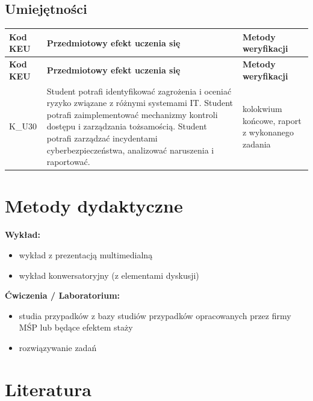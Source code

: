 \documentclass[12pt, a4paper]{article}
\newcommand{\thdrule}{\noalign{\global\setlength{\extrarowheight}{0pt}}}
\newcommand{\thdend}{\noalign{\global\setlength{\extrarowheight}{3pt}}}
\begin{document}
\subsection*{Umiejętności}
{\scriptsize
\begin{longtable}{m{1.6cm}m{9.0cm}m{4.2cm}}
\thdrule\toprule
\rowcolor{pjatkRed} {\color{white}\footnotesize\textbf{\vphantom{Ag}Kod KEU}} & {\color{white}\footnotesize\textbf{\vphantom{Ag}Przedmiotowy efekt uczenia się}} & {\color{white}\footnotesize\textbf{\vphantom{Ag}Metody weryfikacji}} \\
\midrule\thdend
\endfirsthead
\thdrule\toprule
\rowcolor{pjatkRed} {\color{white}\footnotesize\textbf{\vphantom{Ag}Kod KEU}} & {\color{white}\footnotesize\textbf{\vphantom{Ag}Przedmiotowy efekt uczenia się}} & {\color{white}\footnotesize\textbf{\vphantom{Ag}Metody weryfikacji}} \\
\midrule\thdend
\endhead
  \rowcolor{tableRowLight} K\_U30 & Student potrafi identyfikować zagrożenia i oceniać ryzyko związane z różnymi systemami IT. Student potrafi zaimplementować mechanizmy kontroli dostępu i zarządzania tożsamością. Student potrafi zarządzać incydentami cyberbezpieczeństwa, analizować naruszenia i raportować. & kolokwium końcowe, raport z wykonanego zadania \\
\bottomrule
\end{longtable}}

\section{Metody dydaktyczne}

\textbf{Wykład:}
\begin{itemize}
  \item wykład z prezentacją multimedialną
  \item wykład konwersatoryjny (z elementami dyskusji)
\end{itemize}
\vspace{4pt}
\textbf{Ćwiczenia / Laboratorium:}
\begin{itemize}
  \item studia przypadków z bazy studiów przypadków opracowanych przez firmy MŚP lub będące efektem staży
  \item rozwiązywanie zadań
\end{itemize}
\vspace{4pt}


\section{Literatura}
\end{document}
